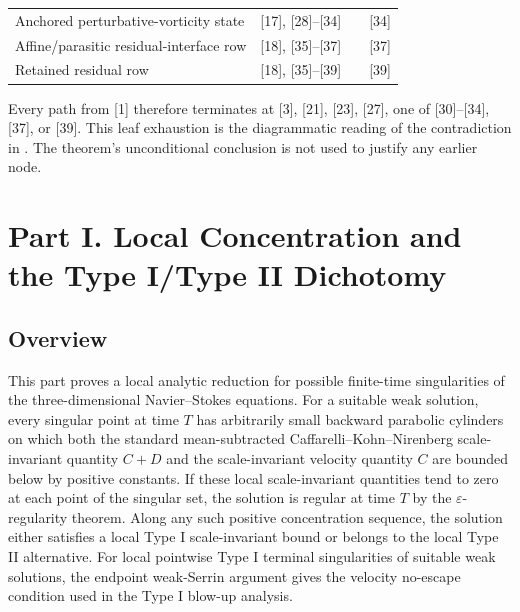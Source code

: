 \documentclass[11pt]{amsart}
\theoremstyle{plain}
\theoremstyle{definition}
\theoremstyle{remark}
\numberwithin{equation}{section}
\begin{document}
\begin{landscape}
\begin{longtable}{@{}L{4.20cm}C{2.35cm}L{8.30cm}L{4.50cm}@{}}
Anchored perturbative-vorticity state & [17], [28]--[34] &
 & [34] \\

Affine/parasitic residual-interface row & [18], [35]--[37] &
 & [37] \\

Retained residual row & [18], [35]--[39] &
 & [39] \\

\end{longtable}
\endgroup

Every path from [1] therefore terminates at [3], [21], [23], [27], one of
[30]--[34], [37], or [39].  This leaf exhaustion is the diagrammatic reading
of the contradiction in .  The theorem's
unconditional conclusion is not used to justify any earlier node.
\end{landscape}

\clearpage
\section*{Part I. Local Concentration and the Type I/Type II Dichotomy}

\subsection*{Overview}

This part proves a local analytic reduction for possible finite-time
singularities of the three-dimensional Navier--Stokes equations.  For a
suitable weak solution,
every singular point at time \(T\) has arbitrarily small backward parabolic
cylinders on which both the standard mean-subtracted
Caffarelli--Kohn--Nirenberg scale-invariant quantity \(C+D\) and the
scale-invariant velocity quantity \(C\) are bounded below by positive
constants.  If these local scale-invariant quantities tend to zero at each
point of the singular set, the solution is regular at time \(T\) by the
\(\varepsilon\)-regularity theorem.  Along any such positive concentration
sequence, the solution either satisfies a local Type I scale-invariant bound or
belongs to the local Type II alternative.  For local pointwise Type I terminal
singularities of suitable weak solutions, the endpoint weak-Serrin argument gives
the velocity no-escape condition
used in the Type I blow-up analysis.
\end{document}
